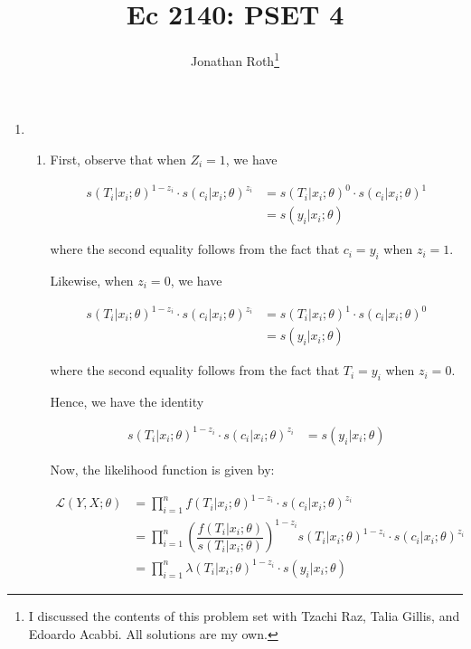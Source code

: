 \documentclass[]{report}
\author{Jonathan Roth\thanks{I discussed the contents of this problem set with Tzachi Raz, Talia Gillis, and Edoardo Acabbi. All solutions are my own.}}
\title{Ec 2140: PSET 4}
\newcommand{\0}{\bv{0}}
\newcommand{\1}{\bv{1}}
\newcommand{\prodonen}[2]{\prod_{#1=1}^n #2}
\begin{document}
	\maketitle

\begin{enumerate}[1.]

\item

\begin{enumerate}
	\item
First, observe that when $Z_i = 1$, we have

\begin{align}
s(T_i | x_i; \theta)^{1 - z_i}  \cdot s(c_i| x_i; \theta)^{z_i} &= s(T_i | x_i; \theta)^{0} \cdot s(c_i| x_i; \theta)^{1}\\
&= s(y_i | x_i; \theta)
\end{align}

where the second equality follows from the fact that $c_i = y_i$ when $z_i = 1$. 

Likewise, when $z_i = 0$, we have

\begin{align}
s(T_i | x_i; \theta)^{1 - z_i}  \cdot s(c_i| x_i; \theta)^{z_i} &= s(T_i | x_i; \theta)^{1} \cdot s(c_i| x_i; \theta)^{0}\\
&= s(y_i | x_i; \theta)
\end{align}

where the second equality follows from the fact that $T_i = y_i$ when $z_i = 0$. 

Hence, we have the identity

\begin{align}
s(T_i | x_i; \theta)^{1 - z_i}  \cdot s(c_i| x_i; \theta)^{z_i}&= s(y_i | x_i; \theta) \label{eqn:szidentity}
\end{align}

Now, the likelihood function is given by:

\begin{align}
	\mathcal{L}(Y,X;\theta) &= \prodonen{i}{  f(T_i| x_i; \theta)^{1-z_i} \cdot s(c_i| x_i ; \theta)^{z_i} }\\
	 &= \prodonen{i}{ \left( \dfrac{ f(T_i| x_i; \theta)}{ s(T_i | x_i; \theta)} \right) ^{1-z_i}  s(T_i | x_i; \theta)^{1-z_i} \cdot s(c_i| x_i ; \theta)^{z_i} }\\
	 &= \prodonen{i}{  \lambda(T_i| x_i; \theta)^{1-z_i} \cdot s(y_i| x_i ; \theta)} \label{eqn:L_general}
\end{align}


\end{enumerate}
\end{enumerate}
\end{document}
